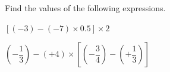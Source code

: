 Find the values of the following expressions.

\begin{subparts}
  \item $[(-3)-(-7)\times 0.5]\times 2$
  \item $(-\dfrac{1}{3})-(+4)\times\left[\left(-\dfrac{3}{4}\right)-\left(+\dfrac{1}{3}\right)\right]$
\end{subparts}

